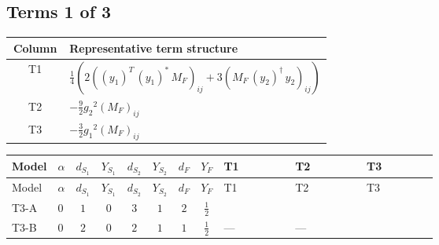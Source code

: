 \documentclass[8pt]{article}
\begin{document}
\begin{landscape}
\subsection*{Terms 1 of 3}
\begin{center}
\begin{tabular}{@{}c >{\raggedright\arraybackslash}p{0.82\linewidth}@{}}
\toprule
Column & Representative term structure \\
\midrule
T1 & \(\displaystyle \frac{1}{4} (2 \left(\left({y_1}\right)^{T}\,\left({y_1}\right)^{*}\,{M_F}\right)_{ij}+3 \left({M_F}\,\left({y_2}\right)^{\dagger}\,{y_2}\right)_{ij})\) \\
\midrule
T2 & \(\displaystyle -\frac{9}{2} {g_2}^2 \left({M_F}\right)_{ij}\) \\
\midrule
T3 & \(\displaystyle -\frac{3}{2} {g_1}^2 \left({M_F}\right)_{ij}\) \\
\midrule
\bottomrule
\end{tabular}
\end{center}
\smallskip
\tiny
\begin{longtable}{@{}llcccccc >{\raggedright\arraybackslash}p{0.21\linewidth} >{\raggedright\arraybackslash}p{0.21\linewidth} >{\raggedright\arraybackslash}p{0.21\linewidth}@{}}
\toprule
Model & $\alpha$ & $d_{S_1}$ & $Y_{S_1}$ & $d_{S_2}$ & $Y_{S_2}$ & $d_F$ & $Y_F$ & T1 & T2 & T3 \\
\midrule
\endfirsthead
\toprule
Model & $\alpha$ & $d_{S_1}$ & $Y_{S_1}$ & $d_{S_2}$ & $Y_{S_2}$ & $d_F$ & $Y_F$ & T1 & T2 & T3 \\
\midrule
\endhead
T3-A & $0$ & $1$ & $0$ & $3$ & $1$ & $2$ & $\frac{1}{2}$ & \scriptsize\adjustbox{max width=\linewidth}{$\begin{gathered} \frac{1}{4} (2 \left(\left({y_1}\right)^{T}\,\left({y_1}\right)^{*}\,{M_F}\right)_{ij}+3 \left({M_F}\,\left({y_2}\right)^{\dagger}\,{y_2}\right)_{ij})\end{gathered}$} & \scriptsize\adjustbox{max width=\linewidth}{$\begin{gathered} -\frac{9}{2} {g_2}^2 \left({M_F}\right)_{ij}\end{gathered}$} & \scriptsize\adjustbox{max width=\linewidth}{$\begin{gathered} -\frac{3}{2} {g_1}^2 \left({M_F}\right)_{ij}\end{gathered}$} \\
\midrule
T3-B & $0$ & $2$ & $0$ & $2$ & $1$ & $1$ & $\frac{1}{2}$ & --- & --- & \scriptsize\adjustbox{max width=\linewidth}{$\begin{gathered} -\frac{3}{2} {g_1}^2 \left({M_F}\right)_{ij}\end{gathered}$} \\

\end{longtable}
\end{landscape}
\end{document}
